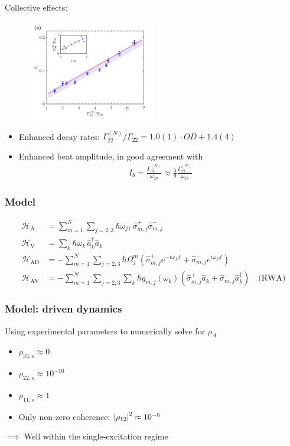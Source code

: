 \documentclass{beamer}
\theoremstyle{definition}
\newcommand{\lp}{\left(}
\newcommand{\rp}{\right)}
\newcommand{\f}[2]{\frac{#1}{#2}}
\begin{document}
\begin{frame}
	Collective effects:
	\begin{figure}[!htb]
		\centering
		\includegraphics[width=0.5\textwidth]{data_Ib.png}
	\end{figure}
\begin{itemize}
	\item Enhanced decay rates: $\Gamma_{22}^{(N)}/\Gamma_{22} = 1.0(1) \cdot OD + 1.4(4)$
	
	\item Enhanced beat amplitude, in good agreement with
	\begin{align*}
	I_b = \f{\Gamma_{33}^{(N)}}{\omega_{23}} \approx \f{5}{9} \f{\Gamma_{22}^{(N)}}{\omega_{23}}
	\end{align*}
\end{itemize}
	
	


\end{frame}


\begin{frame}
	\frametitle{Model}
	\begin{align*}
	\mathcal{H}_\text{A} &= \sum_{m=1}^N \sum_{j=2,3} \hbar \omega_{j1}\, \hat\sigma_{m,j}^+ \hat\sigma_{m,j}^-  \\
	\mathcal{H}_\text{V} &= \sum_k \hbar \omega_k \, \hat a_k^\dagger \hat a_k\\
	\mathcal{H}_\text{AD} &= -\sum^N_{m=1}\sum_{j=2,3} \hbar \Omega^m_j \lp \hat \sigma_{m,j}^+ e^{-i \omega_D t} + \hat \sigma_{m,j}^- e^{i\omega_D t} \rp \\
	\mathcal{H}_\text{AV} &= -\sum^N_{m=1}\sum_{j=2,3} \sum_k \hbar g_{m,j}(\omega_k) \lp \hat \sigma_{m,j}^+ \hat a_k + \hat \sigma^-_{m,j} \hat a^\dagger_k\rp \quad \text{(RWA)}
	\end{align*}
\end{frame}


\begin{frame}
	\frametitle{Model: driven dynamics}
	
	Using experimental parameters to numerically solve for $\rho_A$
	\begin{itemize}
		\item $\rho_{33,s}\approx 0$
		\item $\rho_{22,s}\approx 10^{-10}$
		\item $\rho_{11,s}\approx 1$
		\item Only non-zero coherence: $\abs{\rho_{12}}^2 \approx 10^{-5}$
	\end{itemize}
$\implies$ Well within the single-excitation regime
\end{frame}
\end{document}
